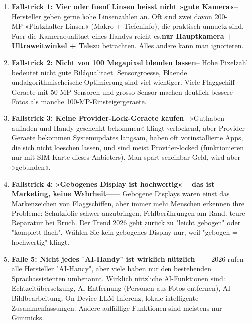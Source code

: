 \begin{enumerate}
  \item \textbf{Fallstrick 1: Vier oder fuenf Linsen heisst nicht »gute Kamera«}– Hersteller geben gerne hohe Linsenzahlen an. Oft sind zwei davon 200-MP-»Platzhalter-Linsen« (Makro + Tiefeninfo), die praktisch unnuetz sind. Fuer die Kameraqualitaet eines Handys reicht es,\textbf{nur Hauptkamera + Ultraweitwinkel + Tele}zu betrachten. Alles andere kann man ignorieren.
  \item \textbf{Fallstrick 2: Nicht von 100 Megapixel blenden lassen}– Hohe Pixelzahl bedeutet nicht gute Bildqualitaet. Sensorgroesse, Blaende undalgorithmischeische Optimierung sind viel wichtiger. Viele Flaggschiff-Geraete mit 50-MP-Sensoren und grosso Sensor machen deutlich bessere Fotos als manche 100-MP-Einsteigergeraete.
  \item \textbf{Fallstrick 3: Keine Provider-Lock-Geraete kaufen}– »Guthaben aufladen und Handy geschenkt bekommen« klingt verlockend, aber Provider-Geraete bekommen Systemupdates langsam, haben oft vorinstallierte Apps, die sich nicht loeschen lassen, und sind meist Provider-locked (funktionieren nur mit SIM-Karte dieses Anbieters). Man spart scheinbar Geld, wird aber »gebunden«.
  \item \textbf{Fallstrick 4: »Gebogenes Display ist hochwertig« – das ist Marketing, keine Wahrheit}—— Gebogene Displays waren einst das Markenzeichen von Flaggschiffen, aber immer mehr Menschen erkennen ihre Probleme: Schutzfolie schwer anzubringen, Fehlberührungen am Rand, teure Reparatur bei Bruch. Der Trend 2026 geht zurück zu "leicht gebogen" oder "komplett flach". Wählen Sie kein gebogenes Display nur, weil "gebogen = hochwertig" klingt.
  \item \textbf{Falle 5: Nicht jedes "AI-Handy" ist wirklich nützlich}—— 2026 rufen alle Hersteller "AI-Handy", aber viele haben nur den bestehenden Sprachassistenten umbenannt. Wirklich nützliche AI-Funktionen sind: Echtzeitübersetzung, AI-Entfernung (Personen aus Fotos entfernen), AI-Bildbearbeitung, On-Device-LLM-Inferenz, lokale intelligente Zusammenfassungen. Andere auffällige Funktionen sind meistens nur Gimmicks.
\end{enumerate}


